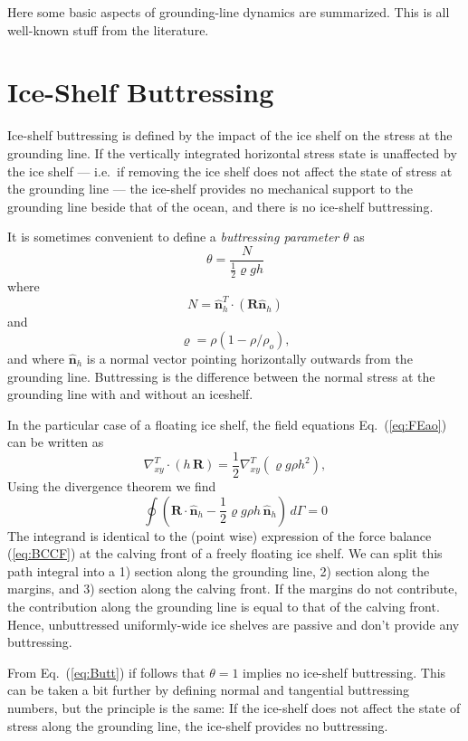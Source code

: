 \documentclass[10pt,a4paper]{book}
\newcommand{\normalh}{\hat{\bm{n}}_h}
\begin{document}
Here some basic aspects of grounding-line dynamics are
summarized. This is all well-known stuff from the literature.

\section{Ice-Shelf Buttressing}

Ice-shelf buttressing is defined by the impact of the ice shelf on the
stress at the grounding line. If the vertically integrated horizontal
stress state is unaffected by the ice shelf --- i.e.\ if removing the
ice shelf does not affect the state of stress at the grounding line
--- the ice-shelf provides no mechanical support to the grounding line
beside that of the ocean, and there is no ice-shelf buttressing. 



It is sometimes convenient to define a {\em buttressing parameter} $\theta$  as
\[
\theta=\frac{N}{\frac{1}{2} \varrho g h}
\]
where
\begin{equation}
N=\normalh^T \cdot ( \bm{R} \normalh)
\end{equation}
and
\[
\varrho=\rho (1-\rho/\rho_o) ,
\]
and where $\normalh$ is a normal vector pointing horizontally outwards
from the grounding line. Buttressing is the difference between the
normal stress at the grounding line with and without an
iceshelf.

In the particular case of a floating ice shelf, the field equations Eq.~(\ref{eq:FEao}) can be written as
\[
\nabla_{xy}^T \cdot (h \, \bm{R}) = \frac{1}{2} \nabla_{xy}^T ( \varrho g \rho h^2 ),
\]
Using the divergence theorem we find 
\begin{equation}
\oint \! ( \bm{R}  \cdot  \normalh - \frac{1}{2}  \varrho g \rho h  \, \normalh) \, d \Gamma  = 0 
\label{eq:Butt}
\end{equation}
The integrand is identical to the (point wise) expression of the force
balance (\ref{eq:BCCF}) at the calving front of a freely floating ice
shelf. We can split this path integral into a 1) section along the
grounding line, 2) section along the margins, and 3) section along the
calving front. If the margins do not contribute, the contribution
along the grounding line is equal to that of the calving front. Hence,
unbuttressed uniformly-wide ice shelves are passive and don't provide any buttressing. 

From Eq.~(\ref{eq:Butt}) if follows that $\theta=1$ implies no
ice-shelf buttressing. This can be taken a bit further by defining
normal and tangential buttressing numbers, but the principle is the
same: If the ice-shelf does not affect the state of stress along the
grounding line, the ice-shelf provides no buttressing.
\end{document}

